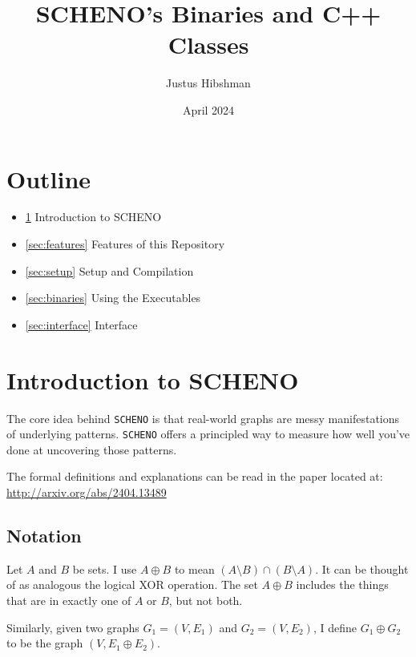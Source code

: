 \documentclass{article}
\begin{document}
\title{SCHENO's Binaries and C++ Classes}

\author{Justus Hibshman}

\date{April 2024}

\maketitle

\vspace{2cm}

\section*{Outline}

\begin{itemize}
    \item \ref{sec:nt_intro} Introduction to SCHENO
    \item \ref{sec:features} Features of this Repository
    \item \ref{sec:setup} Setup and Compilation
    \item \ref{sec:binaries} Using the Executables
    \item \ref{sec:interface} Interface
\end{itemize}


\newpage

\section{Introduction to SCHENO}\label{sec:nt_intro}

The core idea behind \verb|SCHENO| is that real-world graphs are messy manifestations of underlying patterns. \verb|SCHENO| offers a principled way to measure how well you've done at uncovering those patterns.

The formal definitions and explanations can be read in the paper located at: \url{http://arxiv.org/abs/2404.13489}

\subsection{Notation}

Let $A$ and $B$ be sets. I use $A \oplus B$ to mean $(A \setminus B) \cap (B \setminus A)$. It can be thought of as analogous the logical XOR operation. The set $A \oplus B$ includes the things that are in exactly one of $A$ or $B$, but not both.

Similarly, given two graphs $G_1 = (V, E_1)$ and $G_2 = (V, E_2)$, I define $G_1 \oplus G_2$ to be the graph $(V, E_1 \oplus E_2)$.
\end{document}
